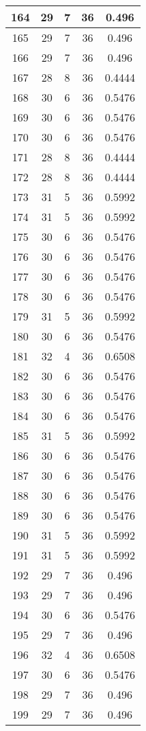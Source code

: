 \documentclass[letterpaper, 12pt]{article}
\begin{document}
\begin{longtable}{|c|c|c|c|c|}
\hline
164 & 29 & 7 & 36 & 0.496 \\
\hline
165 & 29 & 7 & 36 & 0.496 \\
\hline
166 & 29 & 7 & 36 & 0.496 \\
\hline
167 & 28 & 8 & 36 & 0.4444 \\
\hline
168 & 30 & 6 & 36 & 0.5476 \\
\hline
169 & 30 & 6 & 36 & 0.5476 \\
\hline
170 & 30 & 6 & 36 & 0.5476 \\
\hline
171 & 28 & 8 & 36 & 0.4444 \\
\hline
172 & 28 & 8 & 36 & 0.4444 \\
\hline
173 & 31 & 5 & 36 & 0.5992 \\
\hline
174 & 31 & 5 & 36 & 0.5992 \\
\hline
175 & 30 & 6 & 36 & 0.5476 \\
\hline
176 & 30 & 6 & 36 & 0.5476 \\
\hline
177 & 30 & 6 & 36 & 0.5476 \\
\hline
178 & 30 & 6 & 36 & 0.5476 \\
\hline
179 & 31 & 5 & 36 & 0.5992 \\
\hline
180 & 30 & 6 & 36 & 0.5476 \\
\hline
181 & 32 & 4 & 36 & 0.6508 \\
\hline
182 & 30 & 6 & 36 & 0.5476 \\
\hline
183 & 30 & 6 & 36 & 0.5476 \\
\hline
184 & 30 & 6 & 36 & 0.5476 \\
\hline
185 & 31 & 5 & 36 & 0.5992 \\
\hline
186 & 30 & 6 & 36 & 0.5476 \\
\hline
187 & 30 & 6 & 36 & 0.5476 \\
\hline
188 & 30 & 6 & 36 & 0.5476 \\
\hline
189 & 30 & 6 & 36 & 0.5476 \\
\hline
190 & 31 & 5 & 36 & 0.5992 \\
\hline
191 & 31 & 5 & 36 & 0.5992 \\
\hline
192 & 29 & 7 & 36 & 0.496 \\
\hline
193 & 29 & 7 & 36 & 0.496 \\
\hline
194 & 30 & 6 & 36 & 0.5476 \\
\hline
195 & 29 & 7 & 36 & 0.496 \\
\hline
196 & 32 & 4 & 36 & 0.6508 \\
\hline
197 & 30 & 6 & 36 & 0.5476 \\
\hline
198 & 29 & 7 & 36 & 0.496 \\
\hline
199 & 29 & 7 & 36 & 0.496 \\
\hline
\end{longtable}
\end{document}

